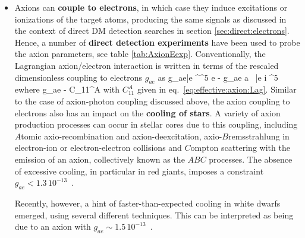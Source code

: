 \begin{itemize}
\item[\scalebox{0.6}{$\blacksquare$}] Axions can {\bf couple to electrons}, in which case they induce excitations or ionizations of the target atoms, producing the same signals as discussed in the context of direct DM detection searches in section \ref{sec:direct:electrons}. Hence, a number of {\bf direct detection experiments} have been used to probe the axion parameters, see table \ref{tab:AxionEexp}. 
Conventionally,  the Lagrangian axion/electron interaction is written in terms of the rescaled dimensionless coupling to electrons $g_{ae}$ as
\beq  
\label{eq:gae}
g_{ae}\bar e \gamma^\mu  \gamma^5 e \simeq - g_{ae} a \, \bar e i \gamma^5 e\qquad\hbox{where}\qquad
g_{ae} \equiv -  C_{11}^A
\eeq
with $C_{11}^A$ given in eq.~\eqref{eq:effective:axion:Lag}. 
Similar to  the case of axion-photon coupling discussed above, the axion coupling to electrons also has an impact on the {\bf cooling of stars}. A variety of axion production processes can occur in stellar cores due to this coupling, including $A$tomic axio-recombination and axion-deexcitation, axio-$B$remsstrahlung in electron-ion or electron-electron collisions and $C$ompton scattering with the emission of an axion, collectively known as the $ABC$ processes.
The absence of excessive cooling, in particular in red giants, imposes a constraint $g_{ae} < 1.3 \, 10^{-13}$~\cite{axionWDcooling}. 

Recently, however, a hint of faster-than-expected cooling in white dwarfs emerged, using several different techniques. This can be interpreted as being due to an axion with $g_{ae} \sim 1.5  \, 10^{-13}$~\cite{axionWDcooling}. 



\end{itemize}


